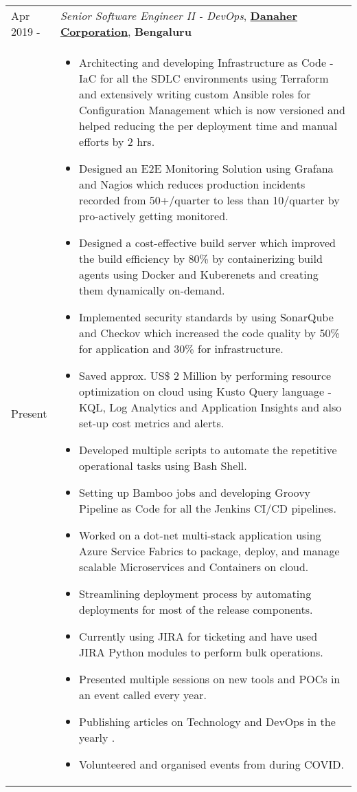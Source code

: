 \documentclass[11pt, a4paper]{article}
\begin{document}
\noindent\begin{tabular}{L{1.7cm}!{\color{gray}\vrule}l}
Apr 2019 -  & \textit{Senior Software Engineer II - DevOps}, \textcolor{NavyBlue}{\textbf{\href{https://www.danaher.com}{Danaher Corporation}}},  \textbf{Bengaluru} \\
Present &
  \begin{minipage}[t]{0.86\textwidth}
    \begin{itemize}[leftmargin=*]
    \itemsep-0.5em 
    \item Architecting and developing Infrastructure as Code - IaC for all the SDLC environments using Terraform and extensively writing custom Ansible roles for Configuration Management which is now versioned and helped reducing the per deployment time and manual efforts by 2 hrs.
    \item Designed an E2E Monitoring Solution using Grafana and Nagios which reduces production incidents recorded from 50+/quarter to less than 10/quarter by pro-actively getting monitored.
    \item Designed a cost-effective build server which improved the build efficiency by 80\% by containerizing build agents using Docker and Kuberenets and creating them dynamically on-demand.
    \item Implemented security standards by using SonarQube and Checkov which increased the code quality by 50\% for application and 30\% for infrastructure. 
     \item Saved approx. US\$ 2 Million by performing resource optimization on cloud using Kusto Query language - KQL, Log Analytics and Application Insights and also set-up cost metrics and alerts.
     \item Developed multiple scripts to automate the repetitive operational tasks using Bash Shell.
     \item Setting up Bamboo jobs and developing Groovy Pipeline as Code for all the Jenkins CI/CD pipelines. 
     \item Worked on a dot-net multi-stack application using Azure Service Fabrics to package, deploy, and manage scalable Microservices and Containers on cloud.
     \item Streamlining deployment process by automating deployments for most of the release components.
     \item Currently using JIRA for ticketing and have used JIRA Python modules to perform bulk operations.
    \item Presented multiple sessions on new tools and POCs in an event called  every year.
    \item Publishing articles on Technology and DevOps in the yearly .
    \item Volunteered and organised  events from  during COVID.
    \end{itemize}
  \end{minipage}
\end{tabular} 
\end{document}
